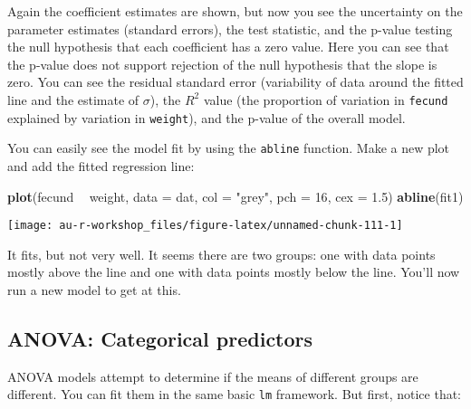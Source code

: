 \documentclass[]{book}
\newenvironment{Shaded}{\begin{snugshade}}{\end{snugshade}}
\newcommand{\KeywordTok}[1]{\textcolor[rgb]{0.13,0.29,0.53}{\textbf{#1}}}
\newcommand{\DataTypeTok}[1]{\textcolor[rgb]{0.13,0.29,0.53}{#1}}
\newcommand{\DecValTok}[1]{\textcolor[rgb]{0.00,0.00,0.81}{#1}}
\newcommand{\FloatTok}[1]{\textcolor[rgb]{0.00,0.00,0.81}{#1}}
\newcommand{\StringTok}[1]{\textcolor[rgb]{0.31,0.60,0.02}{#1}}
\newcommand{\OperatorTok}[1]{\textcolor[rgb]{0.81,0.36,0.00}{\textbf{#1}}}
\newcommand{\NormalTok}[1]{#1}
\theoremstyle{definition}
\theoremstyle{definition}
\theoremstyle{definition}
\theoremstyle{remark}
\begin{document}
Again the coefficient estimates are shown, but now you see the
uncertainty on the parameter estimates (standard errors), the test
statistic, and the p-value testing the null hypothesis that each
coefficient has a zero value. Here you can see that the p-value does not
support rejection of the null hypothesis that the slope is zero. You can
see the residual standard error (variability of data around the fitted
line and the estimate of \(\sigma\)), the \(R^2\) value (the proportion
of variation in \texttt{fecund} explained by variation in
\texttt{weight}), and the p-value of the overall model.

You can easily see the model fit by using the \texttt{abline} function.
Make a new plot and add the fitted regression line:

\begin{Shaded}
\begin{Highlighting}[]
\KeywordTok{plot}\NormalTok{(fecund }\OperatorTok{~}\StringTok{ }\NormalTok{weight, }\DataTypeTok{data =}\NormalTok{ dat, }\DataTypeTok{col =} \StringTok{"grey"}\NormalTok{, }\DataTypeTok{pch =} \DecValTok{16}\NormalTok{, }\DataTypeTok{cex =} \FloatTok{1.5}\NormalTok{)}
\KeywordTok{abline}\NormalTok{(fit1)}
\end{Highlighting}
\end{Shaded}

\begin{center}\texttt{[image: au-r-workshop\_files/figure-latex/unnamed-chunk-111-1]} \end{center}

It fits, but not very well. It seems there are two groups: one with data
points mostly above the line and one with data points mostly below the
line. You'll now run a new model to get at this.

\subsection{ANOVA: Categorical predictors}\label{anova}

ANOVA models attempt to determine if the means of different groups are
different. You can fit them in the same basic \texttt{lm} framework. But
first, notice that:

\begin{Shaded}
\end{Shaded}
\end{document}
